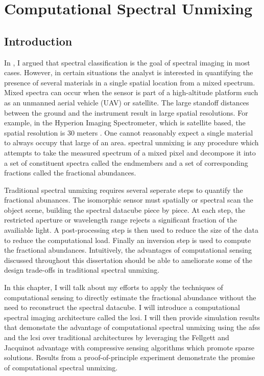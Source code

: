 \chapter{Computational Spectral Unmixing}\label{chap:Csu}

\section{Introduction}

In , I argued that spectral classification is the goal of spectral imaging in most cases. However, in certain situations the analyst is interested in quantifying the presence of several materials in a single spatial location from a \gls{mixed spectrum}. Mixed spectra can occur when the sensor is part of a high-altitude platform such as an unmanned aerial vehicle (UAV) or satellite. The large standoff distances between the ground and the instrument result in large spatial resolutions. For example, in the Hyperion Imaging Spectrometer, which is satellite based, the spatial resolution is 30 meters \cite{folkman2001eo}. One cannot reasonably expect a single material to always occupy that large of an area. \Gls{spectral unmixing} is any procedure which attempts to take the measured spectrum of a mixed pixel and decompose it into a set of constituent spectra called the \glspl{endmember} and a set of corresponding fractions called the \glspl{fractional abundance}. 

Traditional spectral unmixing requires several seperate steps to quantify the fractional abunances. The isomorphic sensor must spatially or spectral scan the object scene, building the spectral datacube piece by piece. At each step, the restricted aperture or wavelength range rejects a significant fraction of the availiable light. A post-processing step is then used to reduce the size of the data to reduce the computational load. Finally an inversion step is used to compute the fractional abundances. Intuitively, the advantages of computational sensing discussed throughout this dissertation should be able to ameliorate some of the design trade-offs in traditional spectral unmixing.

In this chapter, I will talk about my efforts to apply the techniques of computational sensing to directly estimate the \gls{fractional abundance} without the need to reconstruct the spectral datacube. I will introduce a computational spectral imaging architecture called the \gls{lcsi}. I will then provide simulation results that demonstate the advantage of computational spectral unmixing using the \gls{afss} and the \gls{lcsi} over traditional architectures by leveraging the Fellgett and Jacquinot advantage with compressive sensing algorithms which promote sparse solutions. Results from a proof-of-principle experiment demonstrate the promise of computational spectral unmixing. 


